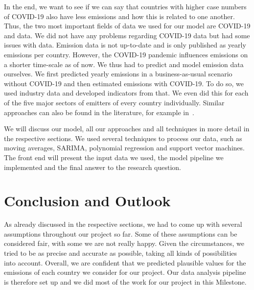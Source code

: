\documentclass{article}
\newcommand{\co}{\text{CO\textsubscript{2} }}
\begin{document}
In the end, we want to see if we can say that countries with higher case numbers of COVID-19 also have less \co emissions and how this is related to one another.
Thus, the two most important fields of data we used for our model are COVID-19 and \co data. We did not have any problems regarding COVID-19 data but had some issues with \co data. Emission data is not up-to-date and is only published as yearly emissions per country. However, the COVID-19 pandemic influences emissions on a shorter time-scale as of now. We thus had to predict and model emission data ourselves.  We first predicted yearly \co emissions in a business-as-usual scenario without COVID-19 and then estimated \co emissions with COVID-19. To do so, we used industry data and developed indicators from that. We even did this for each of the five major sectors of \co emitters of every country individually. Similar approaches can also be found in the literature, for example in~\cite{LeQuere2020}.

We will discuss our model, all our approaches and all techniques in more detail in the respective sections. We used several techniques to process our data, such as moving averages, SARIMA, polynomial regression and support vector machines. The front end will present the input data we used, the model pipeline we implemented and the final answer to the research question.
















%






\section{Conclusion and Outlook}

As already discussed in the respective sections, we had to come up with several assumptions throughout our project so far. Some of these assumptions can be considered fair, with some we are not really happy. Given the circumstances, we tried to be as precise and accurate as possible, taking all kinds of possibilities into account. Overall, we are confident that we predicted plausible values for the \co emissions of each country we consider for our project. Our data analysis pipeline is therefore set up and we did most of the work for our project in this Milestone. 
\end{document}
